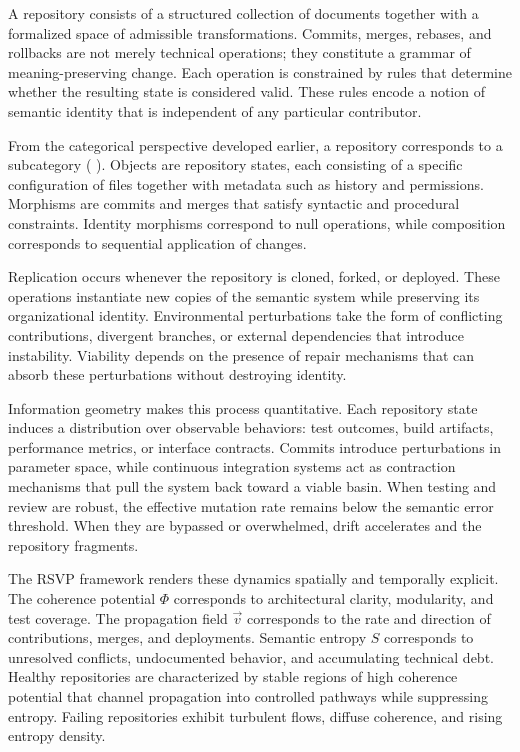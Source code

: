 \documentclass[11pt,oneside]{article}
\begin{document}
A repository consists of a structured collection of documents together with a formalized space of admissible transformations. Commits, merges, rebases, and rollbacks are not merely technical operations; they constitute a grammar of meaning-preserving change. Each operation is constrained by rules that determine whether the resulting state is considered valid. These rules encode a notion of semantic identity that is independent of any particular contributor.

From the categorical perspective developed earlier, a repository corresponds to a subcategory ( \subset {}). Objects are repository states, each consisting of a specific configuration of files together with metadata such as history and permissions. Morphisms are commits and merges that satisfy syntactic and procedural constraints. Identity morphisms correspond to null operations, while composition corresponds to sequential application of changes.

Replication occurs whenever the repository is cloned, forked, or deployed. These operations instantiate new copies of the semantic system while preserving its organizational identity. Environmental perturbations take the form of conflicting contributions, divergent branches, or external dependencies that introduce instability. Viability depends on the presence of repair mechanisms that can absorb these perturbations without destroying identity.

Information geometry makes this process quantitative. Each repository state induces a distribution over observable behaviors: test outcomes, build artifacts, performance metrics, or interface contracts. Commits introduce perturbations in parameter space, while continuous integration systems act as contraction mechanisms that pull the system back toward a viable basin. When testing and review are robust, the effective mutation rate remains below the semantic error threshold. When they are bypassed or overwhelmed, drift accelerates and the repository fragments.

The RSVP framework renders these dynamics spatially and temporally explicit. The coherence potential $\Phi$ corresponds to architectural clarity, modularity, and test coverage. The propagation field $\vec v$ corresponds to the rate and direction of contributions, merges, and deployments. Semantic entropy $S$ corresponds to unresolved conflicts, undocumented behavior, and accumulating technical debt. Healthy repositories are characterized by stable regions of high coherence potential that channel propagation into controlled pathways while suppressing entropy. Failing repositories exhibit turbulent flows, diffuse coherence, and rising entropy density.
\end{document}
